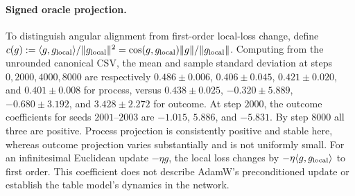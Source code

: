\paragraph{Signed oracle projection.} To distinguish angular alignment
from first-order local-loss change, define
$c(g):=\langle g,g_{\rm local}\rangle/\|g_{\rm local}\|^2
=\cos(g,g_{\rm local})\|g\|/\|g_{\rm local}\|$.
Computing from the unrounded canonical CSV, the mean and sample standard
deviation at steps $0,2000,4000,8000$ are respectively
$0.486\pm0.006$, $0.406\pm0.045$, $0.421\pm0.020$, and $0.401\pm0.008$
for process, versus $0.438\pm0.025$, $-0.320\pm5.889$,
$-0.680\pm3.192$, and $3.428\pm2.272$ for outcome.
At step $2000$, the outcome coefficients for seeds $2001$--$2003$ are
$-1.015$, $5.886$, and $-5.831$. By step $8000$ all three are positive.
Process projection is consistently positive and stable here, whereas
outcome projection varies substantially and is not uniformly small.
For an infinitesimal Euclidean update $-\eta g$, the local loss changes by
$-\eta\langle g,g_{\rm local}\rangle$ to first order. This coefficient
does not describe AdamW's preconditioned update or establish the table
model's dynamics in the network.


